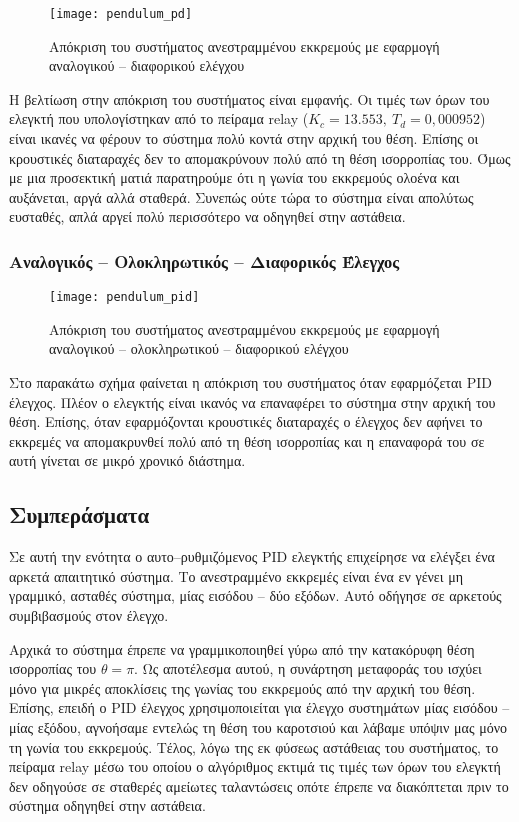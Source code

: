 \begin{figure}[h]
  \centering
  \texttt{[image: pendulum\_pd]}
  \caption{Απόκριση του συστήματος ανεστραμμένου εκκρεμούς με εφαρμογή αναλογικού  --  διαφορικού ελέγχου}
  \label{fig:pendulum_pd}
\end{figure}

Η βελτίωση στην απόκριση του συστήματος είναι εμφανής. Οι τιμές των όρων του ελεγκτή που υπολογίστηκαν από το πείραμα relay ($K_c = 13.553,\ T_d = 0,000952$) είναι ικανές να φέρουν το σύστημα πολύ κοντά στην αρχική του θέση. Επίσης οι κρουστικές διαταραχές δεν το απομακρύνουν πολύ από τη θέση ισορροπίας του. Όμως με μια προσεκτική ματιά παρατηρούμε ότι η γωνία του εκκρεμούς ολοένα και αυξάνεται, αργά αλλά σταθερά. Συνεπώς ούτε τώρα το σύστημα είναι απολύτως ευσταθές, απλά αργεί πολύ περισσότερο να οδηγηθεί στην αστάθεια.

\subsubsection{Αναλογικός  --  Ολοκληρωτικός  --  Διαφορικός Έλεγχος}

\begin{figure}[h]
  \centering
  \texttt{[image: pendulum\_pid]}
  \caption{Απόκριση του συστήματος ανεστραμμένου εκκρεμούς με εφαρμογή αναλογικού  --  ολοκληρωτικού  --  διαφορικού ελέγχου}
  \label{fig:pendulum_pid}
\end{figure}

Στο παρακάτω σχήμα φαίνεται η απόκριση του συστήματος όταν εφαρμόζεται PID έλεγχος. Πλέον ο ελεγκτής είναι ικανός να επαναφέρει το σύστημα στην αρχική του θέση. Επίσης, όταν εφαρμόζονται κρουστικές διαταραχές ο έλεγχος δεν αφήνει το εκκρεμές να απομακρυνθεί πολύ από τη θέση ισορροπίας και η επαναφορά του σε αυτή γίνεται σε μικρό χρονικό διάστημα. 

\subsection{Συμπεράσματα}

Σε αυτή την ενότητα ο αυτο--ρυθμιζόμενος PID ελεγκτής επιχείρησε να ελέγξει ένα αρκετά απαιτητικό σύστημα. Το ανεστραμμένο εκκρεμές είναι ένα εν γένει μη γραμμικό, ασταθές σύστημα, μίας εισόδου -- δύο εξόδων. Αυτό οδήγησε σε αρκετούς συμβιβασμούς στον έλεγχο.

Αρχικά το σύστημα έπρεπε να γραμμικοποιηθεί γύρω από την κατακόρυφη θέση ισορροπίας του $\theta = \pi$. Ως αποτέλεσμα αυτού, η συνάρτηση μεταφοράς του ισχύει μόνο για μικρές αποκλίσεις της γωνίας του εκκρεμούς από την αρχική του θέση. Επίσης, επειδή ο PID έλεγχος χρησιμοποιείται για έλεγχο συστημάτων μίας εισόδου -- μίας εξόδου, αγνοήσαμε εντελώς τη θέση του καροτσιού και λάβαμε υπόψιν μας μόνο τη γωνία του εκκρεμούς. Τέλος, λόγω της εκ φύσεως αστάθειας του συστήματος, το πείραμα relay μέσω του οποίου ο αλγόριθμος εκτιμά τις τιμές των όρων του ελεγκτή δεν οδηγούσε σε σταθερές αμείωτες ταλαντώσεις οπότε έπρεπε να διακόπτεται πριν το σύστημα οδηγηθεί στην αστάθεια. 

